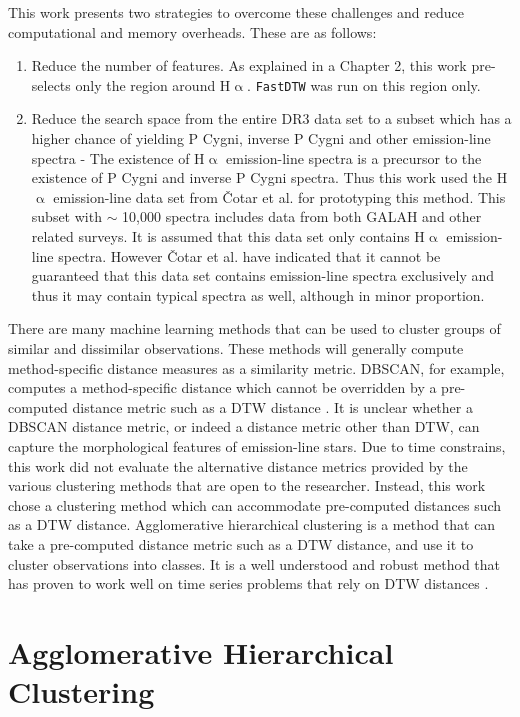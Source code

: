 This work presents two strategies to overcome these challenges and reduce computational and memory overheads. These are as follows:

\begin{enumerate}
    \item Reduce the number of features. As explained in a Chapter 2, this work pre-selects only the region around H$\upalpha$. \texttt{FastDTW} was run on this region only.
    \item Reduce the search space from the entire DR3 data set to a subset which has a higher chance of yielding P Cygni, inverse P Cygni and other emission-line spectra - The existence of H$\upalpha$ emission-line spectra is a precursor to the existence of P Cygni and inverse P Cygni spectra. Thus this work used the H$\upalpha$ emission-line data set from Čotar et al.\citep{vcotar2021galah} for prototyping this method. This subset with $\sim$ 10,000 spectra includes data from both GALAH and other related surveys. It is assumed that this data set only contains H$\upalpha$ emission-line spectra. However  Čotar et al. have indicated that it cannot be guaranteed that this data set contains emission-line spectra exclusively and thus it may contain typical spectra as well, although in minor proportion. 
\end{enumerate}

There are many machine learning methods that can be used to cluster groups of similar and dissimilar observations. These methods will generally compute method-specific distance measures as a similarity metric. DBSCAN, for example, computes a method-specific distance which cannot be overridden by a pre-computed distance metric such as a DTW distance \citep{traven2017galah}. It is unclear whether a DBSCAN distance metric, or indeed a distance metric other than DTW, can capture the morphological features of emission-line stars. Due to time constrains, this work did not evaluate the alternative distance metrics provided by the various clustering methods that are open to the researcher. Instead, this work chose a clustering method which can accommodate pre-computed distances such as a DTW distance. Agglomerative hierarchical clustering is a method that can take a pre-computed distance metric such as a DTW distance, and use it to cluster observations into classes. It is a well understood and robust method that has proven to work well on time series problems that rely on DTW distances \citep{nielsen2019practical}.

\section{Agglomerative Hierarchical Clustering}

